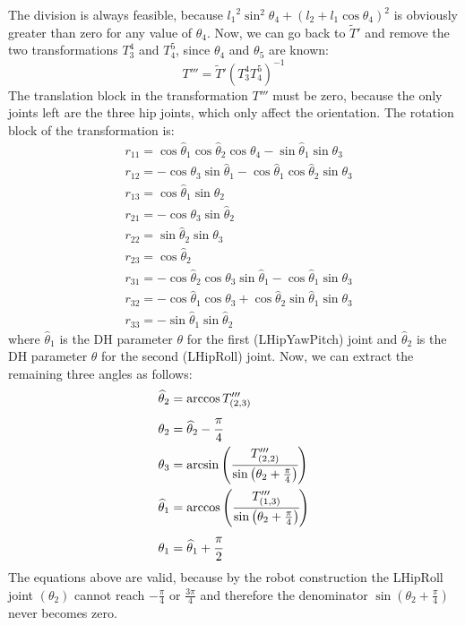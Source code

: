 The division is always feasible, because ${l_1}^2\sin^2\theta_4 + \left(l_2 + l_1\cos\theta_4\right)^2$ is obviously greater than zero for any value of $\theta_4$. 
Now, we can go back to $\widetilde{T}'$ and remove the two transformations $T^4_3$ and $T^5_4$, since $\theta_4$ and $\theta_5$ are known: 
\[
T''' = \widetilde{T}' \left(T^4_3T^5_4\right)^{-1}
\]
The translation block in the transformation $T'''$ must be zero, because the only joints left are the three hip joints, which only affect the orientation. The rotation block of the transformation is:
\begin{align*}
&r_{11} = \cos\widehat{\theta}_1\cos\widehat{\theta}_2\cos\theta_4 - \sin\widehat{\theta}_1\sin\theta_3\\
&r_{12} = -\cos\theta_3\sin\widehat{\theta}_1 - \cos\widehat{\theta}_1\cos\widehat{\theta}_2\sin\theta_3\\
&r_{13} = \cos\widehat{\theta}_1\sin\widehat{\theta}_2 \\
&r_{21} = -\cos\theta_3\sin\widehat{\theta}_2\\
&r_{22} = \sin\widehat{\theta}_2\sin\theta_3\\
&r_{23} = \cos\widehat{\theta}_2\\
&r_{31} = -\cos\widehat{\theta}_2\cos\theta_3\sin\widehat{\theta}_1 - \cos\widehat{\theta}_1\sin\theta_3\\
&r_{32} = -\cos\widehat{\theta}_1\cos\theta_3 + \cos\widehat{\theta}_2\sin\widehat{\theta}_1\sin\theta_3\\
&r_{33} = -\sin\widehat{\theta}_1\sin\widehat{\theta}_2
\end{align*}
where $\widehat{\theta}_1$ is the DH parameter $\theta$ for the first (LHipYawPitch) joint and $\widehat{\theta}_2$ is the DH parameter $\theta$ for the second (LHipRoll) joint.
Now, we can extract the remaining three angles as follows:
\begin{align*}
\widehat{\theta}_2 &= \arccos T'''_{(2,3)}\\
\theta_2 &= \widehat{\theta}_2 - \cfrac{\pi}{4}\\
\theta_3 &= \arcsin\left(\cfrac{T'''_{(2,2)}}{\sin\left(\theta_2+\frac{\pi}{4}\right)}\right)\\
\widehat{\theta}_1 &= \arccos\left(\cfrac{T'''_{(1,3)}}{\sin\left(\theta_2+\frac{\pi}{4}\right)}\right)\\
\theta_1 &= \widehat{\theta}_1 + \cfrac{\pi}{2}
\end{align*}
The equations above are valid, because by the robot construction the LHipRoll joint $(\theta_2)$ cannot reach $-\frac{\pi}{4}$ or $\frac{3\pi}{4}$ and therefore the denominator $\sin\left(\theta_2+\frac{\pi}{4}\right)$ never becomes zero. 


